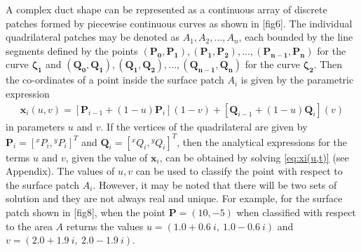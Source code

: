 \documentclass[11pt,a4paper]{article}
\begin{document}
A complex duct shape can be represented as a continuous array of discrete patches formed by piecewise continuous curves as shown in [fig6]. The individual quadrilateral patches may be denoted as $A_1,A_2,...,A_n$, each bounded by the line segments defined by the points $\mathbf{(P_0,P_1),(P_1,P_2),...,(P_{n-1},P_n)}$ for the curve $\mathbf{\zeta_1}$ and $\mathbf{(Q_0,Q_1),(Q_1,Q_2),...,(Q_{n-1},Q_n)}$ for the curve $\mathbf{\zeta_2}$. Then the co-ordinates of a point inside the surface patch $A_i$ is given by the parametric expression
\begin{align}
\label{eq:xi(u,t)}
\mathbf{x}_i(u,v)= \left[ \mathbf{P}_{i-1}+\left(1-{u} \right)\mathbf{P}_i  \right]\left(1-{v}\right) +\left[\mathbf{ Q}_{i-1}+\left(1-{u} \right)\mathbf{Q}_i  \right]\left({v}\right)
\end{align}
in parameters $u$ and $v$. If the vertices of the quadrilateral are given by $\mathbf{P}_{i}=\left[ {}^xP_{i},{}^yP_{i}\right]^T $ and $\mathbf{Q}_{i}=\left[ {}^xQ_{i},{}^yQ_{i}\right]^T $, then the analytical expressions for the terms $u$ and ${v}$, given the value of $\mathbf{x}_i$, can be obtained by solving \ref{eq:xi(u,t)} (see Appendix). The values of $u,v$ can be used to classify the point with respect to the surface patch $A_i$. However, it may be noted that there will be two sets of solution and they are not always real and unique. For example, for the surface patch shown in [fig8], when the point $\mathbf{P} =\left(10,-5 \right)$ when classified with respect to the area $A$ returns the values $u=\left( 1.0 + 0.6~i,~1.0 - 0.6~i \right)$ and $v=\left(2.0 + 1.9~i,~2.0 - 1.9~i\right)$.
\end{document}
